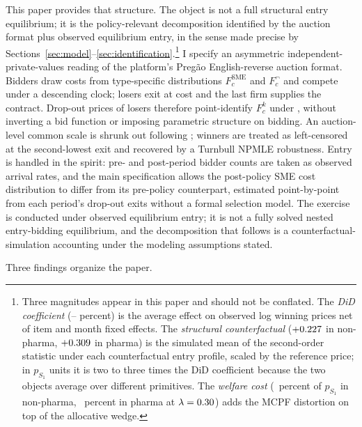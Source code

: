 This paper provides that structure. The object is not a full structural entry equilibrium; it is the policy-relevant decomposition identified by the auction format plus observed equilibrium entry, in the sense made precise by Sections~\ref{sec:model}--\ref{sec:identification}.\footnote{Three magnitudes appear in this paper and should not be conflated. The \emph{DiD coefficient} (\didLowerPct{}--\didUpperPct{} percent) is the average effect on observed log winning prices net of item and month fixed effects. The \emph{structural counterfactual} ($+0.227$ in non-pharma, $+0.309$ in pharma) is the simulated mean of the second-order statistic under each counterfactual entry profile, scaled by the reference price; in $p_{S_1}$ units it is two to three times the DiD coefficient because the two objects average over different primitives. The \emph{welfare cost} (\welfLossPctLthirtyNp{}~percent of $p_{S_1}$ in non-pharma, \welfLossPctLthirtyPh{}~percent in pharma at $\lambda = 0.30$) adds the MCPF distortion on top of the allocative wedge.} I specify an asymmetric independent-private-values reading of the platform's Preg\~ao English-reverse auction format. Bidders draw costs from type-specific distributions $F_c^{\text{SME}}$ and $F_c^{\neg}$ and compete under a descending clock; losers exit at cost and the last firm supplies the contract. Drop-out prices of losers therefore point-identify $F_c^k$ under \citet{haile2003}, without inverting a bid function or imposing parametric structure on bidding. An auction-level common scale is shrunk out following \citet{krasnokutskaya2011}; winners are treated as left-censored at the second-lowest exit and recovered by a Turnbull NPMLE robustness. Entry is handled in the \citet{atheyseira2011} spirit: pre- and post-period bidder counts are taken as observed arrival rates, and the main specification allows the post-policy SME cost distribution to differ from its pre-policy counterpart, estimated point-by-point from each period's drop-out exits without a formal selection model. The exercise is conducted under observed equilibrium entry; it is not a fully solved nested entry-bidding equilibrium, and the decomposition that follows is a counterfactual-simulation accounting under the modeling assumptions stated.

Three findings organize the paper.

